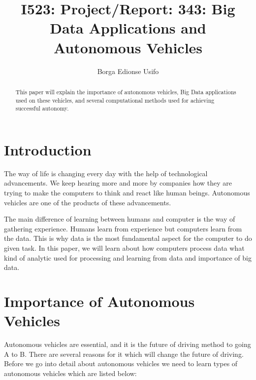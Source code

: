 \documentclass[sigconf]{acmart}
\begin{document}
\title{I523: Project/Report: 343: Big Data Applications and Autonomous Vehicles}

\author{Borga Edionse Usifo}

\renewcommand{\shortauthors}{B. Trovato et al.}

\maketitle

\begin{abstract}
This paper will explain the importance of autonomous vehicles, Big Data applications used on these vehicles, and several computational methods used for achieving successful autonomy. 
\end{abstract}

\section{Introduction}
The way of life is changing every day with the help of technological advancements. We keep hearing more and more by companies how they are trying to make the computers to think and react like human beings. Autonomous vehicles are one of the products of these advancements. 
\par The main difference of learning between humans and computer is the way of gathering experience. Humans learn from experience but computers learn from the data. This is why data is the most fundamental aspect for the computer to do given task. In this paper, we will learn about how computers process data what kind of analytic used for processing and learning from data and importance of big data.    



\section{Importance of Autonomous Vehicles}

Autonomous vehicles are essential, and it is the future of driving method to going A to B. There are several reasons for it which will change the future of driving. Before we go into detail about autonomous vehicles we need to learn types of autonomous vehicles which are listed below: 
\end{document}
